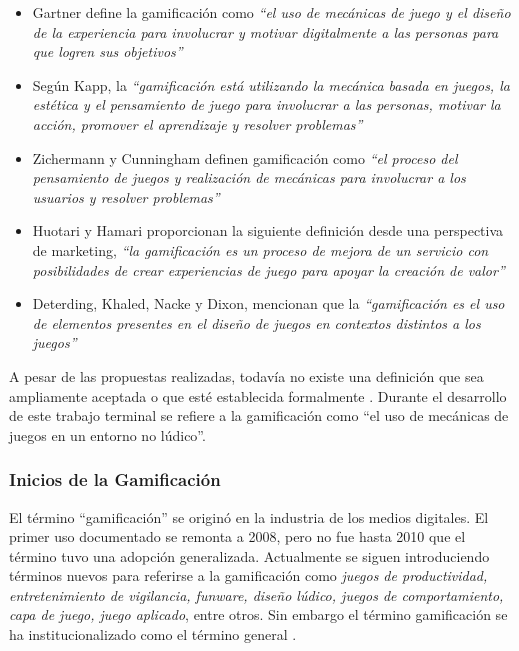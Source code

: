     \begin{itemize}

        \item Gartner define la gamificación como {\it ``el uso de mecánicas de juego y
        el diseño de la experiencia para involucrar y motivar digitalmente a las personas para
        que logren sus objetivos''} \cite{Burke}

        \item Según Kapp, la {\it ``gamificación está utilizando la mecánica basada en juegos,
        la estética y el pensamiento de juego para involucrar a las personas, motivar la acción,
        promover el aprendizaje y resolver problemas''} \cite{Kapp}

        \item Zichermann y Cunningham definen gamificación como {\it ``el proceso del
        pensamiento de juegos y realización de mecánicas para involucrar a los usuarios y resolver
        problemas''} \cite{GamByDesign} %

        \item Huotari y Hamari proporcionan la siguiente definición desde una perspectiva de marketing,
        {\it ``la gamificación es un proceso de mejora de un servicio con posibilidades de crear
        experiencias de juego para apoyar la creación de valor''} \cite{Huotari}  %

        \item Deterding, Khaled, Nacke y Dixon, mencionan que la {\it ``gamificación
        es el uso de elementos presentes en el diseño de juegos en contextos distintos a
        los juegos''} \cite{DeterdingDefinition} %

    \end{itemize}

 \noindent A pesar de las propuestas realizadas, todavía no existe una definición que sea
 ampliamente aceptada o que esté establecida formalmente \cite{Seaborn}. Durante el desarrollo
 de este trabajo terminal se refiere a la gamificación como ``el uso de mecánicas
 de juegos en un entorno no lúdico''.


\subsubsection{Inicios de la Gamificación}

 El término ``gamificación'' se originó en la industria de los medios digitales.
 El primer uso documentado se remonta a 2008, pero no fue hasta 2010 que el término
 tuvo una adopción generalizada. Actualmente se siguen introduciendo términos nuevos
 para referirse a la gamificación como {\it juegos de productividad, entretenimiento
 de vigilancia, funware, diseño lúdico, juegos de comportamiento, capa de juego,
 juego aplicado}, entre otros. Sin embargo el término gamificación se ha
 institucionalizado como el término general \cite{DeterdingGamefulness}.\\


